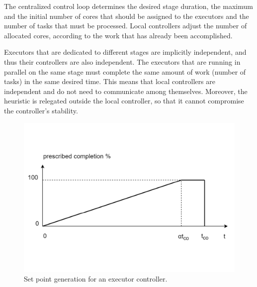 The centralized control loop determines the desired stage duration, the maximum and the initial number of cores that should be assigned to the executors and the number of tasks that must be processed. Local controllers adjust the number of allocated cores, according to
the work that has already been accomplished.

Executors that are dedicated to different stages are implicitly independent, and thus their controllers are also independent. The executors that are running in parallel on the same stage must complete the same amount of work (number of tasks) in the same desired time.
This means that local controllers are independent and do not need to communicate among themselves. Moreover, the heuristic is relegated outside the local controller, so that it cannot compromise the controller’s stability.
\begin{figure}
	\vspace{-1cm}
	\centering
	\includegraphics[width=\columnwidth]{Images/exec_controller_set_point.pdf}  
	\vspace{-2cm}
	\caption[Set point generation for an executor controller.]{Set point generation for an executor controller.}
	\label{fig:execControllerSetPoint}
\end{figure}
